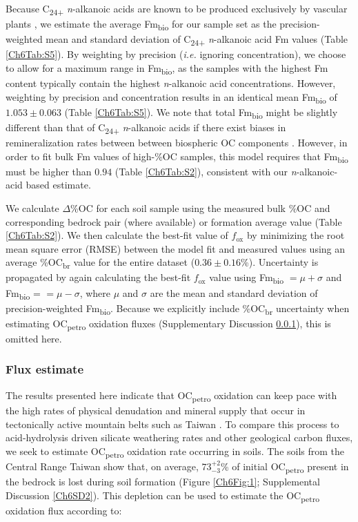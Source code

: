 Because C\textsubscript{24+} \textit{n}-alkanoic acids are known to be produced exclusively by vascular plants \citep[see][for review]{Eglinton:2008hs}, we estimate the average Fm\textsubscript{bio} for our sample set as the precision-weighted mean and standard deviation of C\textsubscript{24+} \textit{n}-alkanoic acid Fm values (Table \ref{Ch6Tab:S5}). By weighting by precision (\textit{i.e.} ignoring concentration), we choose to allow for a maximum range in Fm\textsubscript{bio}, as the samples with the highest Fm content typically contain the highest \textit{n}-alkanoic acid concentrations. However, weighting by precision and concentration results in an identical mean Fm\textsubscript{bio} of $1.053 \pm 0.063$ (Table \ref{Ch6Tab:S5}). We note that total Fm\textsubscript{bio} might be slightly different than that of C\textsubscript{24+} \textit{n}-alkanoic acids if there exist biases in remineralization rates between between biospheric OC components \citep[\textit{e.g.}][]{Cranwell:1981vg,Meyers:1993vwa}. However, in order to fit bulk Fm values of high-\%OC samples, this model requires that Fm\textsubscript{bio} must be higher than $0.94$ (Table \ref{Ch6Tab:S2}), consistent with our \textit{n}-alkanoic-acid based estimate.

We calculate $\Delta$\%OC for each soil sample using the measured bulk \%OC and corresponding bedrock pair (where available) or formation average value (Table \ref{Ch6Tab:S2}). We then calculate the best-fit value of $f_{\text{ox}}$ by minimizing the root mean square error (RMSE) between the model fit and measured values using an average \%OC\textsubscript{br} value for the entire dataset ($0.36 \pm 0.16$\%). Uncertainty is propagated by again calculating the best-fit $f_{\text{ox}}$ value using Fm\textsubscript{bio} $= \mu + \sigma$ and Fm\textsubscript{bio} = $= \mu - \sigma$, where $\mu$ and $\sigma$ are the mean and standard deviation of precision-weighted Fm\textsubscript{bio}. Because we explicitly include \%OC\textsubscript{br} uncertainty when estimating OC\textsubscript{petro} oxidation fluxes (Supplementary Discussion \ref{Ch6SD4}), this is omitted here.

\subsubsection{Flux estimate}\label{Ch6SD4}

The results presented here indicate that OC\textsubscript{petro} oxidation can keep pace with the high rates of physical denudation and mineral supply that occur in tectonically active mountain belts such as Taiwan \citep{Dadson:2003kl}. To compare this process to acid-hydrolysis driven silicate weathering rates and other geological carbon fluxes, we seek to estimate OC\textsubscript{petro} oxidation rate occurring in soils. The soils from the Central Range Taiwan show that, on average, $73^{+2}_{-3}$\% of initial OC\textsubscript{petro} present in the bedrock is lost during soil formation (Figure \ref{Ch6Fig:1}; Supplemental Discussion \ref{Ch6SD2}). This depletion can be used to estimate the OC\textsubscript{petro} oxidation flux according to:

